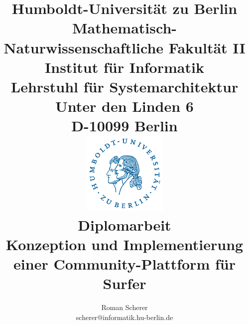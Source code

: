 \documentclass[12pt,a4paper,ngerman]{report}
\author{Roman Scherer \\ scherer@informatik.hu-berlin.de}
\title{{\small
    Humboldt-Universität zu Berlin \\
    Mathematisch-Naturwissenschaftliche Fakultät II \\
    Institut für Informatik \\
    Lehrstuhl für Systemarchitektur \\
    Unter den Linden 6 \\
    D-10099 Berlin \\
  } \vspace{0.4cm}
  \includegraphics[width=4cm]{bilder/husiegel_bw} \\
  \vspace{0.4cm}
  \large{Diplomarbeit} \\
  \LARGE{\textbf{Konzeption und Implementierung einer Community-Plattform für Surfer}} \\
}
\begin{document}
\maketitle
\makenomenclature



\tableofcontents
\printnomenclature











\end{document}
